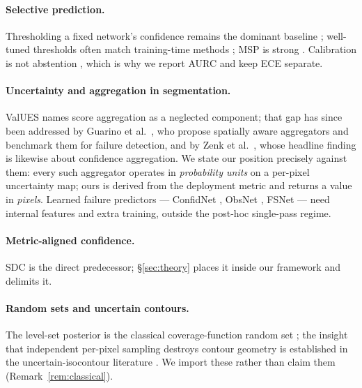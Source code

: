 \documentclass[11pt]{article}
\theoremstyle{remark}
\begin{document}
\paragraph{Selective prediction.} Thresholding a fixed network's confidence remains
the dominant baseline \cite{selectivenet}; well-tuned thresholds often match
training-time methods \cite{feng}; MSP is strong \cite{jaeger}. Calibration is not
abstention \cite{zhu}, which is why we report AURC and keep ECE separate.

\paragraph{Uncertainty and aggregation in segmentation.} ValUES \cite{values} names
score aggregation as a neglected component; that gap has since been addressed by
Guarino et al.\ \cite{guarino}, who propose spatially aware aggregators and
benchmark them for failure detection, and by Zenk et al.\ \cite{zenk}, whose
headline finding is likewise about confidence aggregation. We state our position
precisely against them: every such aggregator operates in \emph{probability units}
on a per-pixel uncertainty map; ours is derived from the deployment metric and
returns a value in \emph{pixels}. Learned failure predictors --- ConfidNet
\cite{confidnet}, ObsNet \cite{obsnet}, FSNet \cite{fsnet} --- need internal features
and extra training, outside the post-hoc single-pass regime.

\paragraph{Metric-aligned confidence.} SDC \cite{sdc} is the direct predecessor;
\S\ref{sec:theory} places it inside our framework and delimits it.

\paragraph{Random sets and uncertain contours.} The level-set posterior is the
classical coverage-function random set \cite{goodman,molchanov}; the insight that
independent per-pixel sampling destroys contour geometry is established in the
uncertain-isocontour literature \cite{poethkow,bolin}. We import these rather than
claim them (Remark~\ref{rem:classical}).
\end{document}

